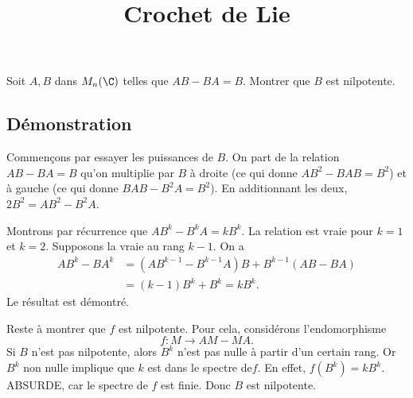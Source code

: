 \documentclass[fontsize=12pt,twoside=false,parskip=half, french]{scrartcl}
\title{Crochet de Lie}
\date{}
\author{}
\begin{document}
\maketitle
   \begin{Theoreme}
      Soit $A, B$ dans $M_n(\C)$ telles que $AB - BA = B$. Montrer que $B$ est nilpotente.
   \end{Theoreme}
   \subsection{Démonstration}
      Commençons par essayer les puissances de $B$. On part de la relation $AB - BA = B$ qu’on multiplie
      par $B$ à droite (ce qui donne $AB^2 - BAB = B^2$) et à gauche (ce qui donne $BAB - B^2A = B^2$).
      En additionnant les deux, $2B^2 = AB^2 - B^2A$. 
      
      Montrons par récurrence que $AB^k - B^kA = kB^k$. La relation est vraie pour $k = 1$ et $k = 2$.
      Supposons la vraie au rang $k -1$. On a 
      \begin{align*}
         AB^k - BA^k &= (AB^{k - 1} - B^{k - 1}A)B + B^{k - 1}(AB - BA)\\
                     &= (k - 1)B^k + B^k = kB^k.
      \end{align*}
      Le résultat est démontré.
      
      Reste à montrer que $f$ est nilpotente. Pour cela, considérons l’endomorphisme
      \[
         f \colon M \to AM - MA.
      \]
      Si $B$ n’est pas nilpotente, alors $B^k$ n’est pas nulle à partir d’un certain rang. Or $B^k$ non nulle implique
      que $k$ est dans le spectre de$f$. En effet, $f(B^k) = kB^k$. ABSURDE, car le spectre de $f$ est finie.
      Donc $B$ est nilpotente.
\end{document}
